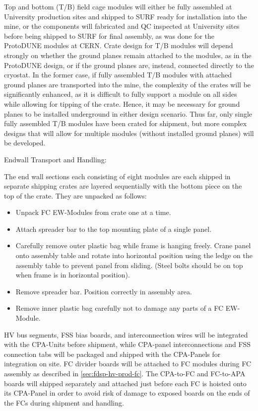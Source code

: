 Top and bottom (T/B) field cage modules will either be fully assembled at University production sites and shipped to SURF ready for installation into the mine, or the components will fabricated and QC inspected at University sites before being shipped to SURF for final assembly, as was done for the ProtoDUNE modules at CERN. Crate design for T/B modules will depend strongly on whether the ground planes remain attached to the modules, as in the ProtoDUNE design, or if the ground planes are, instead, connected directly to the cryostat. In the former case, if fully assembled T/B modules with attached ground planes are transported into the mine, the complexity of the crates will be significantly enhanced, as it is difficult to fully support a module on all sides while allowing for tipping of the crate. Hence, it may be necessary for ground planes to be installed underground in either design scenario. Thus far, only single fully assembled T/B modules have been crated for shipment, but more complex designs that will allow for multiple modules (without installed ground planes) will be developed.

Endwall Transport and Handling:

The end wall sections each consisting of eight modules are each shipped in separate shipping crates are layered sequentially with the bottom piece on the top of the crate.  They are unpacked as follows:

\begin{itemize}
\item Unpack FC EW-Modules from crate one at a time. 
\item Attach spreader bar to the  top mounting plate of a single panel.
\item Carefully remove outer plastic bag while frame is hanging freely.
Crane panel onto assembly table and rotate into horizontal position using the ledge on the assembly table to prevent panel from sliding. 
(Steel bolts should be on top when frame is in horizontal position).
\item Remove spreader bar. Position correctly in assembly area.
\item Remove inner plastic bag carefully not to damage any parts of a FC EW-Module.
\end{itemize}

HV bus segments, FSS bias boards, and  interconnection wires will be integrated with the CPA-Units before shipment, while CPA-panel interconnections and FSS connection tabs will be packaged and shipped with the CPA-Panels for integration on site.
FC divider boards will be attached to FC modules during FC assembly as described in \ref{sec:fdsp-hv-prod-fc}.
The CPA-to-FC and FC-to-APA boards will shipped separately and attached just before each FC is hoisted onto its CPA-Panel in order to avoid risk of damage to exposed boards on the ends of the FCs during shipment and handling.


